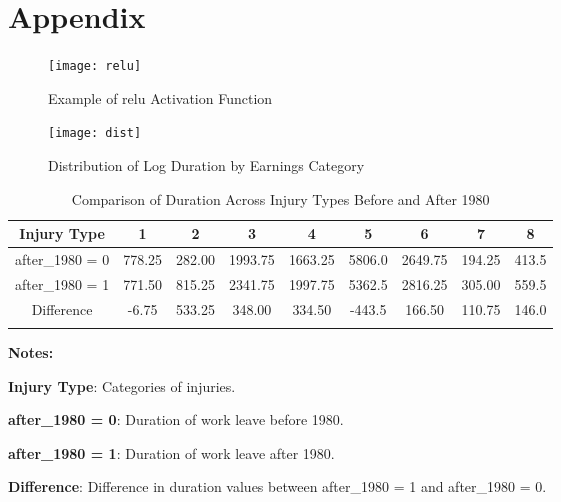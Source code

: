 \section*{Appendix}



\begin{figure}[h]
\centering
\caption{Example of \ac{relu} Activation Function}
\texttt{[image: relu]}
\label{fig:relu}
\end{figure}



\begin{figure}[h]
\centering
\caption{Distribution of Log Duration by Earnings Category}
\texttt{[image: dist]}
\label{fig:log_duration_distribution}
\end{figure}




\begin{table}[ht]
\centering
\caption{Comparison of Duration Across Injury Types Before and After 1980}
\label{tab:duration}
\begin{threeparttable}
\begin{tabular}{ccccccccc}
Injury Type & \textbf{1} & \textbf{2} & \textbf{3} & \textbf{4} & \textbf{5} & \textbf{6} & \textbf{7} & \textbf{8} \\
\hline
\hline
\addlinespace
after\_1980 = 0 & 778.25 & 282.00 & 1993.75 & 1663.25 & 5806.0 & 2649.75 & 194.25 & 413.5 \\
after\_1980 = 1 & 771.50 & 815.25 & 2341.75 & 1997.75 & 5362.5 & 2816.25 & 305.00 & 559.5 \\
Difference & -6.75 & 533.25 & 348.00 & 334.50 & -443.5 & 166.50 & 110.75 & 146.0 \\ \addlinespace
\end{tabular}
\begin{tablenotes}
\small
\item \textbf{Notes:}
\item \textbf{Injury Type}: Categories of injuries.
\item \textbf{after\_1980 = 0}: Duration of work leave before 1980.
\item \textbf{after\_1980 = 1}: Duration of work leave  after 1980.
\item \textbf{Difference}: Difference in duration values between after\_1980 = 1 and after\_1980 = 0.
\end{tablenotes}
\end{threeparttable}
\end{table}


